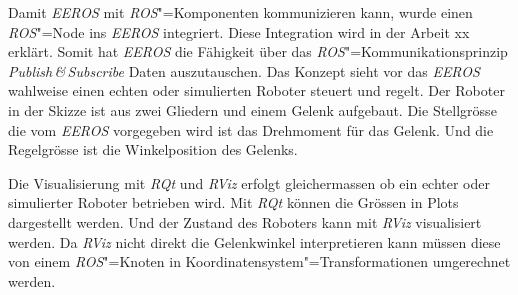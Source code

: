 Damit \textit{EEROS} mit \textit{ROS}"=Komponenten kommunizieren kann, wurde einen \textit{ROS}"=Node ins \textit{EEROS} integriert.
Diese Integration wird in der Arbeit xx erklärt. %
Somit hat \textit{EEROS} die Fähigkeit über das \textit{ROS}"=Kommunikationsprinzip \textit{Publish\,\&\,Subscribe} Daten auszutauschen.
Das Konzept sieht vor das \textit{EEROS} wahlweise einen echten oder simulierten Roboter steuert und regelt.
Der Roboter in der Skizze ist aus zwei Gliedern und einem Gelenk aufgebaut.
Die Stellgrösse die vom \textit{EEROS} vorgegeben wird ist das Drehmoment für das Gelenk.
Und die Regelgrösse ist die Winkelposition des Gelenks.

Die Visualisierung mit \textit{RQt} und \textit{RViz} erfolgt gleichermassen ob ein echter oder simulierter Roboter betrieben wird.
Mit \textit{RQt} können die Grössen in Plots dargestellt werden.
Und der Zustand des Roboters kann mit \textit{RViz} visualisiert werden.
Da \textit{RViz} nicht direkt die Gelenkwinkel interpretieren kann müssen diese von einem \textit{ROS}"=Knoten in Koordinatensystem"=Transformationen umgerechnet werden. %






